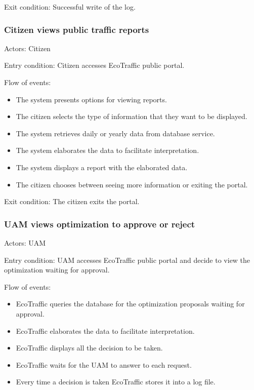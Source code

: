 \documentclass[12pt, a4paper, twoside, openright]{report}
\begin{document}
Exit condition: Successful write of the log.

\subsubsection{Citizen views public traffic reports}


Actors: Citizen

Entry condition: Citizen accesses EcoTraffic public portal.

Flow of events:

\begin{itemize}
\item
  The system presents options for viewing reports.
\item
  The citizen selects the type of information that they want to be
  displayed.
  
\item 
  The system retrieves daily or yearly data from database service.
\item  
  The system elaborates the data to facilitate interpretation.  
\item  
  The system displays a report with the elaborated data.  
\item  
  The citizen chooses between seeing more information or exiting the
  portal.  
\end{itemize}

Exit condition: The citizen exits the portal.


\subsubsection{UAM views optimization to approve or reject}

Actors: UAM

Entry condition: UAM accesses EcoTraffic public portal and decide to
view the optimization waiting for approval.

Flow of events:

\begin{itemize}
\item
  
  EcoTraffic queries the database for the optimization proposals waiting
  for approval.
  
\item
  
  EcoTraffic elaborates the data to facilitate interpretation.
  
\item
  
  EcoTraffic displays all the decision to be taken.
  
\item  
  EcoTraffic waits for the UAM to answer to each request.
  
\item
  
  Every time a decision is taken EcoTraffic stores it into a log file.
  
\end{itemize}
\end{document}
